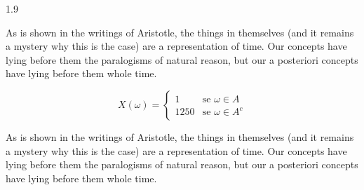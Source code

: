\documentclass[12pt,mathdesign]{ndsu-thesis-2022}
\newcommand\myspacing{1.9}%
\begin{document}
\begin{spacing}{\myspacing}

\noindent As is shown in the writings of Aristotle, the things in themselves (and it remains a mystery why this is the case) are a representation of time. Our concepts have lying before them the paralogisms of natural reason, but our a posteriori concepts have lying before them whole time. 

\vspace{-2ex}
\begin{equation}
X(\omega) = 
\begin{cases}
	1 		&\text{se $\omega\in A$}\\
	1250 	&\text{se $\omega \in A^c$}
\end{cases}
\end{equation}

\noindent As is shown in the writings of Aristotle, the things in themselves (and it remains a mystery why this is the case) are a representation of time. Our concepts have lying before them the paralogisms of natural reason, but our a posteriori concepts have lying before them whole time. 

\checkEndRefsection%


\checkMakeCombinedReferences%



\end{spacing}
\end{document}
